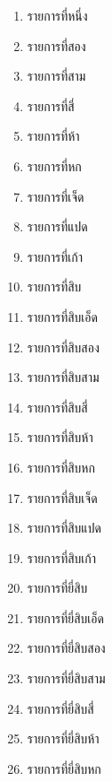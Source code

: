 \documentclass[11pt]{ltxguide}
\begin{document}
\begin{multicols}{4}
    \scriptsize
    \begin{enumerate}[listparindent=0pc,topsep=0pc,itemsep=0pc,label={\thaialph*.}]
        \item  รายการ{\wbr}ที่{\wbr}หนึ่ง{\wbr}
        \item  รายการ{\wbr}ที่{\wbr}สอง{\wbr}
        \item  รายการ{\wbr}ที่{\wbr}สาม{\wbr}
        \item  รายการ{\wbr}ที่{\wbr}สี่{\wbr}
        \item  รายการ{\wbr}ที่{\wbr}ห้า{\wbr}
        \item  รายการ{\wbr}ที่{\wbr}หก{\wbr}
        \item  รายการ{\wbr}ที่{\wbr}เจ็ด{\wbr}
        \item  รายการ{\wbr}ที่{\wbr}แปด{\wbr}
        \item  รายการ{\wbr}ที่{\wbr}เก้า{\wbr}
        \item  รายการ{\wbr}ที่{\wbr}สิบ{\wbr}
        \item  รายการ{\wbr}ที่{\wbr}สิบ{\wbr}เอ็ด{\wbr}
        \item  รายการ{\wbr}ที่{\wbr}สิบ{\wbr}สอง{\wbr}
        \item  รายการ{\wbr}ที่{\wbr}สิบ{\wbr}สาม{\wbr}
        \item  รายการ{\wbr}ที่{\wbr}สิบ{\wbr}สี่{\wbr}
        \item  รายการ{\wbr}ที่{\wbr}สิบ{\wbr}ห้า{\wbr}
        \item  รายการ{\wbr}ที่{\wbr}สิบ{\wbr}หก{\wbr}
        \item  รายการ{\wbr}ที่{\wbr}สิบ{\wbr}เจ็ด{\wbr}
        \item  รายการ{\wbr}ที่{\wbr}สิบ{\wbr}แปด{\wbr}
        \item  รายการ{\wbr}ที่{\wbr}สิบ{\wbr}เก้า{\wbr}
        \item  รายการ{\wbr}ที่{\wbr}ยี่{\wbr}สิบ{\wbr}
        \item  รายการ{\wbr}ที่{\wbr}ยี่{\wbr}สิบ{\wbr}เอ็ด{\wbr}
        \item  รายการ{\wbr}ที่{\wbr}ยี่{\wbr}สิบ{\wbr}สอง{\wbr}
        \item  รายการ{\wbr}ที่{\wbr}ยี่{\wbr}สิบ{\wbr}สาม{\wbr}
        \item  รายการ{\wbr}ที่{\wbr}ยี่{\wbr}สิบ{\wbr}สี่{\wbr}
        \item  รายการ{\wbr}ที่{\wbr}ยี่{\wbr}สิบ{\wbr}ห้า{\wbr}
        \item  รายการ{\wbr}ที่{\wbr}ยี่{\wbr}สิบ{\wbr}หก{\wbr}

\end{enumerate}
\end{multicols}
\end{document}
